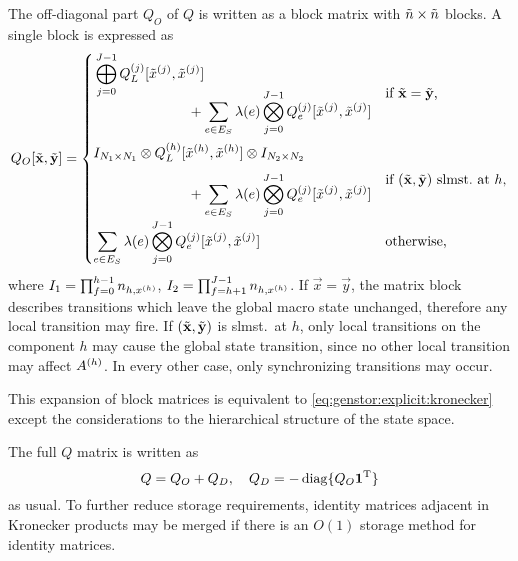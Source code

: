The off-diagonal part $Q_O$ of $Q$ is written as a block matrix with
$\tilde{n} \times \tilde{n}$ blocks. A single block is expressed as
\begin{equation}
  \label{eq:genstor:explicit:block:block}
  Q_O[\macro{\vec{x}}, \macro{\vec{y}}] = \begin{cases}
    \begin{multlined}[c][7cm]
      \bigkrplus_{j = 0}^{J - 1}
      \loc{Q_L}{j}[\loc{\macro{x}}{j}, \loc{\macro{x}}{j}]\\[-4.5ex]
      + \sum_{e \in E_S} \lambda(e) \bigkrtimes_{j = 0}^{J - 1}
      \loc{Q_e}{j}[\loc{\macro{x}}{j}, \loc{\macro{x}}{j}]
    \end{multlined}
    & \text{if $\macro{\vec{x}} = \macro{\vec{y}}$,} \\[6.5ex]
    \begin{multlined}[c][7cm]
      I_{N_1 \times N_1} \krtimes
      \loc{Q_L}{h}[\loc{\macro{x}}{h}, \loc{\macro{x}}{h}] \krtimes
      I_{N_2 \times N_2} \\[-1.5ex]
      + \sum_{e \in E_S} \lambda(e) \bigkrtimes_{j = 0}^{J - 1}
      \loc{Q_e}{j}[\loc{\macro{x}}{j}, \loc{\macro{x}}{j}]
    \end{multlined}
    & \text{if
      $(\macro{\vec{x}}, \macro{\vec{y}})$ slmst.~at $h$,} \\[5ex]
    \displaystyle \sum_{e \in E_S} \lambda(e) \bigkrtimes_{j = 0}^{J - 1}
      \loc{Q_e}{j}[\loc{\macro{x}}{j}, \loc{\macro{x}}{j}] &
      \text{otherwise,}
  \end{cases}
\end{equation}
where $I_1 = \prod_{f = 0}^{h - 1} n_{h, x^{(h)}}$,
$I_2 = \prod_{f = h + 1}^{J - 1} n_{h, x^{(h)}}$. If
$\vec{x} = \vec{y}$, the matrix block describes transitions which
leave the global macro state unchanged, therefore any local transition
may fire. If $(\tilde{\bm{\mathrm{x}}}, \tilde{\bm{\mathrm{y}}})$ is slmst.~at $h$,
only local transitions on the component $h$ may cause the global state
transition, since no other local transition may affect
$A^{(h)}$. In every other case, only synchronizing transitions may
occur.

This expansion of block matrices is equivalent to
\vref{eq:genstor:explicit:kronecker} except the considerations to the
hierarchical structure of the state space.

The full $Q$ matrix is written as
\begin{equation}
  Q = Q_O + Q_D, \quad Q_D = -\operatorname{diag}\{ Q_O \bm{\mathrm{1}}^{\mathrm{T}} \}
\end{equation}
as usual. To further reduce storage requirements, identity matrices
adjacent in Kronecker products may be merged if there is an $O(1)$
storage method for identity matrices.